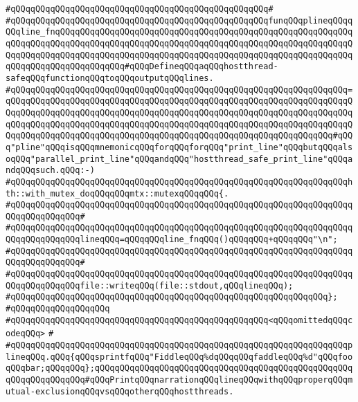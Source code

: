 \verb|#qQQqqQQqqQQqqQQqqQQqqQQqqQQqqQQqqQQqqQQqqQQqqQQqqQQq#|\newline
\verb|#qQQqqQQqqQQqqQQqqQQqqQQqqQQqqQQqqQQqqQQqqQQqqQQqqQQqfunqQQqplineqQQqqQQqline_fnqQQqqQQqqQQqqQQqqQQqqQQqqQQqqQQqqQQqqQQqqQQqqQQqqQQqqQQqqQQqqQQqqQQqqQQqqQQqqQQqqQQqqQQqqQQqqQQqqQQqqQQqqQQqqQQqqQQqqQQqqQQqqQQqqQQqqQQqqQQqqQQqqQQqqQQqqQQqqQQqqQQqqQQqqQQqqQQqqQQqqQQqqQQqqQQqqQQqqQQqqQQqqQQqqQQqqQQqqQQqqQQq#qQQqDefineqQQqaqQQqhostthread-safeqQQqfunctionqQQqtoqQQqoutputqQQqlines.|\newline
\verb|#qQQqqQQqqQQqqQQqqQQqqQQqqQQqqQQqqQQqqQQqqQQqqQQqqQQqqQQqqQQqqQQqqQQq=qQQqqQQqqQQqqQQqqQQqqQQqqQQqqQQqqQQqqQQqqQQqqQQqqQQqqQQqqQQqqQQqqQQqqQQqqQQqqQQqqQQqqQQqqQQqqQQqqQQqqQQqqQQqqQQqqQQqqQQqqQQqqQQqqQQqqQQqqQQqqQQqqQQqqQQqqQQqqQQqqQQqqQQqqQQqqQQqqQQqqQQqqQQqqQQqqQQqqQQqqQQqqQQqqQQqqQQqqQQqqQQqqQQqqQQqqQQqqQQqqQQqqQQqqQQqqQQqqQQqqQQqqQQqqQQqqQQq#qQQq"pline"qQQqisqQQqmnemonicqQQqforqQQqforqQQq"print_line"qQQqbutqQQqalsoqQQq"parallel_print_line"qQQqandqQQq"hostthread_safe_print_line"qQQqandqQQqsuch.qQQq:-)|\newline
\verb|#qQQqqQQqqQQqqQQqqQQqqQQqqQQqqQQqqQQqqQQqqQQqqQQqqQQqqQQqqQQqqQQqqQQqhth::with_mutex_doqQQqqQQqmtx::mutexqQQqqQQq{.|\newline
\verb|#qQQqqQQqqQQqqQQqqQQqqQQqqQQqqQQqqQQqqQQqqQQqqQQqqQQqqQQqqQQqqQQqqQQqqQQqqQQqqQQqqQQq#|\newline
\verb|#qQQqqQQqqQQqqQQqqQQqqQQqqQQqqQQqqQQqqQQqqQQqqQQqqQQqqQQqqQQqqQQqqQQqqQQqqQQqqQQqqQQqlineqQQq=qQQqqQQqline_fnqQQq()qQQqqQQq+qQQqqQQq"\n";|\newline
\verb|#qQQqqQQqqQQqqQQqqQQqqQQqqQQqqQQqqQQqqQQqqQQqqQQqqQQqqQQqqQQqqQQqqQQqqQQqqQQqqQQqqQQq#|\newline
\verb|#qQQqqQQqqQQqqQQqqQQqqQQqqQQqqQQqqQQqqQQqqQQqqQQqqQQqqQQqqQQqqQQqqQQqqQQqqQQqqQQqqQQqfile::writeqQQq(file::stdout,qQQqlineqQQq);|\newline
\verb|#qQQqqQQqqQQqqQQqqQQqqQQqqQQqqQQqqQQqqQQqqQQqqQQqqQQqqQQqqQQqqQQq};|\newline
\verb|#qQQqqQQqqQQqqQQqqQQq|\newline
\verb|#qQQqqQQqqQQqqQQqqQQqqQQqqQQqqQQqqQQqqQQqqQQqqQQqqQQq<qQQqomittedqQQqcodeqQQq>|\newline
\verb|#|\newline
\verb|#qQQqqQQqqQQqqQQqqQQqqQQqqQQqqQQqqQQqqQQqqQQqqQQqqQQqqQQqqQQqqQQqqQQqplineqQQq.qQQq{qQQqsprintfqQQq"FiddleqQQq%dqQQqqQQqfaddleqQQq%d"qQQqfooqQQqbar;qQQqqQQq};qQQqqQQqqQQqqQQqqQQqqQQqqQQqqQQqqQQqqQQqqQQqqQQqqQQqqQQqqQQqqQQqqQQq#qQQqPrintqQQqnarrationqQQqlineqQQqwithqQQqproperqQQqmutual-exclusionqQQqvsqQQqotherqQQqhostthreads.|\newline
